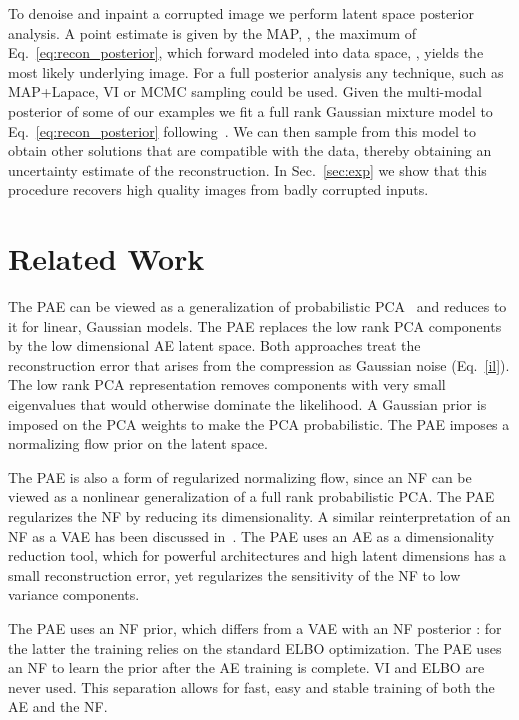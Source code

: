 \documentclass{article}
\begin{document}
To denoise and inpaint a corrupted image we perform latent space posterior analysis. A point estimate is given by the MAP, , the maximum of Eq.~\ref{eq:recon_posterior}, which forward modeled into data space, , yields the most likely underlying image. For a full posterior analysis any technique, such as MAP+Lapace, VI or MCMC sampling could be used. Given the multi-modal posterior of some of our examples we fit a full rank Gaussian mixture model to Eq.~\ref{eq:recon_posterior} following~\cite{SeljakYu19}. We can then sample from this model to obtain other solutions that are compatible with the data, thereby obtaining an uncertainty estimate of the reconstruction.
In Sec.~\ref{sec:exp} we show that this procedure recovers high quality images from badly corrupted inputs.
\section{Related Work}
\label{sec:rel_work}
The PAE can be viewed as a generalization of probabilistic PCA~\citep{TippingBishop1999} and reduces to it for linear, Gaussian models. The PAE replaces the low rank PCA components by the low dimensional AE latent space. Both approaches treat the reconstruction error that arises from the compression as Gaussian noise (Eq.~\ref{il}). The low rank PCA representation removes components with very small eigenvalues that would otherwise dominate the likelihood. A Gaussian prior is imposed on the PCA weights to make the PCA probabilistic. The PAE imposes a normalizing flow prior on the latent space. 

The PAE is also a form of regularized normalizing flow, since an NF can be viewed as a nonlinear generalization of a full rank probabilistic PCA. The PAE regularizes the NF by reducing its dimensionality. A similar reinterpretation of an NF as a VAE has been discussed in~\cite{GritsenkoSnoekEtAl19}. The PAE uses an AE as a dimensionality reduction tool, which for powerful architectures and high latent dimensions has a small reconstruction error, yet regularizes the sensitivity of the NF to low variance components. 

The PAE uses an NF prior, which differs from a VAE with an NF posterior \citep{RezendeMohamed15}: for the latter the training relies on the standard ELBO optimization. 
The PAE uses an NF to learn the prior after the AE training is complete. VI and ELBO are never used. This separation allows for fast, easy and stable training of both the AE and the NF. 
\end{document}
